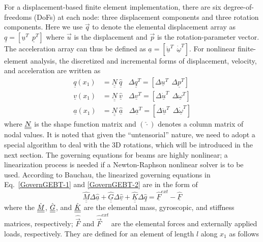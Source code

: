 For a displacement-based finite element implementation, there are six
degree-of-freedoms (DoFs) at each node: three displacement components and three
rotation components. Here we use $\vec{q}$ to denote the elemental
displacement array as $\underline{q}=\left[
\underline{u}^T~~\underline{p}^T\right]$ where $\vec{u}$ is the
displacement and $\vec{p}$ is the rotation-parameter vector. The
acceleration array can thus be defined as $\underline{a}=\left[
\ddot{\underline{u}}^T~~ \dot{\underline{\omega}}^T \right]$. For nonlinear
finite-element analysis, the discretized and incremental forms of
displacement, velocity, and acceleration are written as
\begin{align}
	\label{Discretized}
	\underline{q} (x_1) &= \underline{\underline{N}} ~\hat{\underline{q}}~~~~\Delta \underline{q}^T = \left[ \Delta \underline{u}^T~~\Delta \underline{p}^T \right] \\
	\underline{v}(x_1) &= \underline{\underline{N}}~\hat{\underline{v}}~~~~\Delta \underline{v}^T = \left[\Delta \underline{\dot{u}}^T~~\Delta \underline{\omega}^T \right] \\
	\underline{a}(x_1) &= \underline{\underline{N}}~ \hat{\underline{a}}~~~~\Delta \underline{a}^T = \left[ \Delta \ddot{\underline{u}}^T~~\Delta \dot{\underline{\omega}}^T \right]	
\end{align}
where $\underline{\underline{N}}$ is the shape function matrix and $(\hat{\cdot})$ denotes a
column matrix of nodal values. It is noted that given the ``untensorial''
nature, we need to adopt a special algorithm to deal with the 3D rotations,
which will be introduced in the next section.   The governing equations for
beams are highly nonlinear;  a linearization process is needed if a
Newton-Raphson nonlinear solver is to be used.
According to Bauchau\cite{Bauchau:2010}, the linearized governing equations
in Eq.~\eqref{GovernGEBT-1} and \eqref{GovernGEBT-2} are in the form of
\begin{equation}
	\label{LinearizedEqn}
	\hat{\underline{\underline{M}}} \Delta \hat{\underline{a}} +\hat{\underline{\underline{G}}} \Delta \hat{\underline{v}}+ \hat{\underline{\underline{K}}} \Delta \hat{\underline{q}} = \hat{\underline{F}}^{ext} - \hat{\underline{F}}
\end{equation} 
where the $\hat{\underline{\underline{M}}}$, $\hat{\underline{\underline{G}}}$, and $\hat{\underline{\underline{K}}}$ are the
elemental mass, gyroscopic, and stiffness matrices, respectively;
$\hat{\vec{F}}$ and $\hat{\vec{F}}^{ext}$ are the elemental forces and
externally applied loads, respectively. They are defined for an element of length $l$ along $x_1$ as follows
